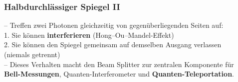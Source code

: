\begin{frame}
	\frametitle{Halbdurchl{\"a}ssiger Spiegel II}
	-- Treffen zwei Photonen gleichzeitig von gegen{\"u}berliegenden Seiten auf:\\
	\hspace{0.5em} 1. Sie können \textbf{interferieren} (Hong–Ou–Mandel-Effekt)\\
	\hspace{0.5em} 2. Sie können den Spiegel gemeinsam auf demselben Ausgang verlassen\\
		\hspace{1.7em} (niemals getrennt)\\
	-- Dieses Verhalten macht den Beam Splitter zur zentralen Komponente für \\
		\hspace{0.5em} \textbf{Bell-Messungen}, Quanten-Interferometer und \textbf{Quanten-Teleportation}.
\end{frame}